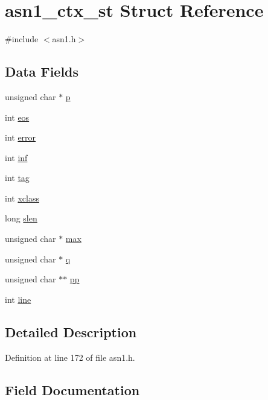 \hypertarget{structasn1__ctx__st}{}\section{asn1\+\_\+ctx\+\_\+st Struct Reference}
\label{structasn1__ctx__st}


{\ttfamily \#include $<$asn1.\+h$>$}

\subsection*{Data Fields}
\begin{DoxyCompactItemize}
\item 
unsigned char $\ast$ \hyperlink{structasn1__ctx__st_af18a92ce774f4c499544fbcc894db7e8}{p}
\item 
int \hyperlink{structasn1__ctx__st_a361b5c8443971a7dbab5f334babedaed}{eos}
\item 
int \hyperlink{structasn1__ctx__st_a11614f44ef4d939bdd984953346a7572}{error}
\item 
int \hyperlink{structasn1__ctx__st_a0726229cd75e3b3be1d6e3c8fccacb87}{inf}
\item 
int \hyperlink{structasn1__ctx__st_aab34f2fc02b4a86bea93c68e1ec09d75}{tag}
\item 
int \hyperlink{structasn1__ctx__st_aa80351b0a17519e53a90e18c92ca7945}{xclass}
\item 
long \hyperlink{structasn1__ctx__st_ac86d4f0cab60f9deb74badbd7f64014c}{slen}
\item 
unsigned char $\ast$ \hyperlink{structasn1__ctx__st_a03b204c49bdfe16da0a2a086a4b971c9}{max}
\item 
unsigned char $\ast$ \hyperlink{structasn1__ctx__st_affc26df06755a72577614b085b91728e}{q}
\item 
unsigned char $\ast$$\ast$ \hyperlink{structasn1__ctx__st_a46042b5ff30d2b6751320722b9f2f1c0}{pp}
\item 
int \hyperlink{structasn1__ctx__st_a41ebd28ef1d7c6ade45642cb6acc1039}{line}
\end{DoxyCompactItemize}


\subsection{Detailed Description}


Definition at line 172 of file asn1.\+h.



\subsection{Field Documentation}
